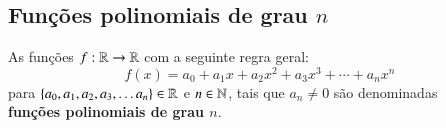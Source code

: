 \subsection{Funções polinomiais de grau \texorpdfstring{$n$}{n}}

 \vskip0.3cm
 \colorbox{azul}{
 \begin{minipage}{0.9\linewidth}
 \begin{center}
 As funções $f: \mathbb{R} \to \mathbb{R}$ com a seguinte regra geral:
 \[f(x) = a_0 + a_1 x + a_2 x^2 + a_3 x^3 + \cdots + a_n x^n\]
 para $\{a_0, a_1, a_2, a_3, \ldots a_n\} \in \mathbb{R}$ e $n \in \mathbb{N}$, tais que $a_n \neq 0$ são denominadas \\ \textbf{funções polinomiais de grau $n$}.
 \end{center}
 \end{minipage}}
 \vskip0.3cm

 


